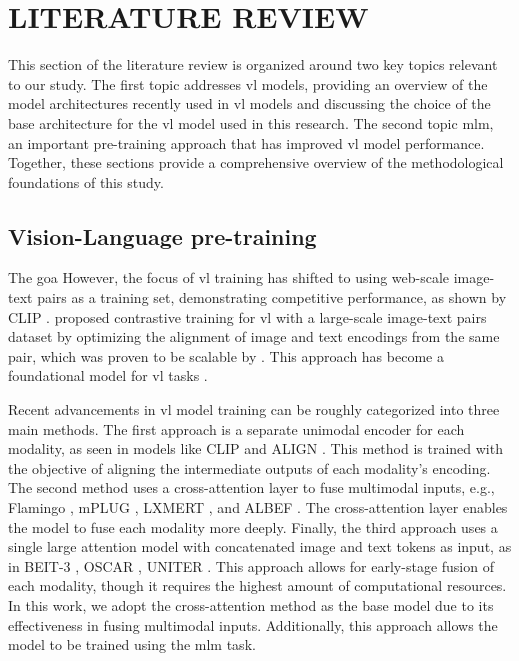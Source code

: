 \chapter{LITERATURE REVIEW}
This section of the literature review is organized around two key topics relevant to our study.
The first topic addresses \acrshort{vl} models, providing an overview of the model architectures recently used in \acrshort{vl} models and discussing the choice of the base architecture for the \acrshort{vl} model used in this research.
The second topic \acrshort{mlm}, an important pre-training approach that has improved \acrshort{vl} model performance.
Together, these sections provide a comprehensive overview of the methodological foundations of this study.

\section{Vision-Language pre-training}
The goa
However, the focus of \acrshort{vl} training has shifted to using web-scale image-text pairs as a training set, demonstrating competitive performance, as shown by CLIP \cite{clip}. 
 proposed contrastive training for \acrshort{vl} with a large-scale image-text pairs dataset by optimizing the alignment of image and text encodings from the same pair, which was proven to be scalable by . 
This approach has become a foundational model for \acrshort{vl} tasks \cite{foundation_model}.

Recent advancements in \acrshort{vl} model training can be roughly categorized into three main methods.  
The first approach is a separate unimodal encoder for each modality, as seen in models like CLIP \cite{clip} and ALIGN \cite{align}. 
This method is trained with the objective of aligning the intermediate outputs of each modality's encoding.  
The second method uses a cross-attention layer to fuse multimodal inputs, e.g., Flamingo \cite{flamingo}, mPLUG \cite{mplug}, LXMERT \cite{lxmert}, and ALBEF \cite{albef}. 
The cross-attention layer enables the model to fuse each modality more deeply.  
Finally, the third approach uses a single large attention model with concatenated image and text tokens as input, as in BEIT-3 \cite{beit-3}, OSCAR \cite{oscar}, UNITER \cite{uniter}. 
This approach allows for early-stage fusion of each modality, though it requires the highest amount of computational resources.  
In this work, we adopt the cross-attention method as the base model due to its effectiveness in fusing multimodal inputs. 
Additionally, this approach allows the model to be trained using the \acrshort{mlm} task.

